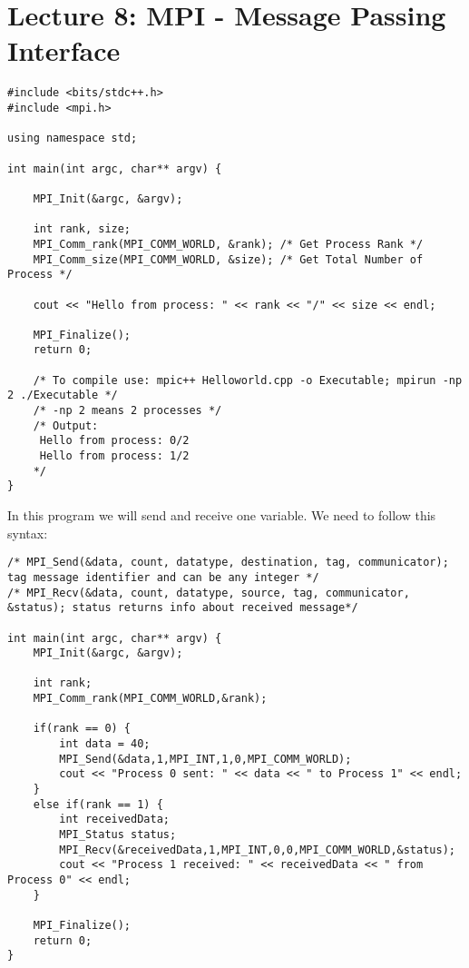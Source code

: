 \section*{Lecture 8: MPI - Message Passing Interface}

\begin{lstlisting}
#include <bits/stdc++.h>
#include <mpi.h>

using namespace std;

int main(int argc, char** argv) {

    MPI_Init(&argc, &argv); 

    int rank, size;
    MPI_Comm_rank(MPI_COMM_WORLD, &rank); /* Get Process Rank */
    MPI_Comm_size(MPI_COMM_WORLD, &size); /* Get Total Number of Process */

    cout << "Hello from process: " << rank << "/" << size << endl;

    MPI_Finalize();
    return 0;   

    /* To compile use: mpic++ Helloworld.cpp -o Executable; mpirun -np 2 ./Executable */
    /* -np 2 means 2 processes */
    /* Output:
     Hello from process: 0/2
     Hello from process: 1/2
    */
}
\end{lstlisting}

 In this program we will send and receive one variable. We need to follow this syntax:
\begin{lstlisting}
/* MPI_Send(&data, count, datatype, destination, tag, communicator); tag message identifier and can be any integer */
/* MPI_Recv(&data, count, datatype, source, tag, communicator, &status); status returns info about received message*/

int main(int argc, char** argv) {
    MPI_Init(&argc, &argv);

    int rank;
    MPI_Comm_rank(MPI_COMM_WORLD,&rank);

    if(rank == 0) {
        int data = 40;
        MPI_Send(&data,1,MPI_INT,1,0,MPI_COMM_WORLD); 
        cout << "Process 0 sent: " << data << " to Process 1" << endl;
    }    
    else if(rank == 1) {
        int receivedData;
        MPI_Status status;
        MPI_Recv(&receivedData,1,MPI_INT,0,0,MPI_COMM_WORLD,&status); 
        cout << "Process 1 received: " << receivedData << " from Process 0" << endl;
    }
    
    MPI_Finalize();
    return 0;
}
\end{lstlisting}

